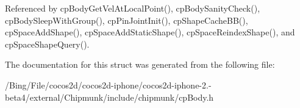 Referenced by cp\-Body\-Get\-Vel\-At\-Local\-Point(), cp\-Body\-Sanity\-Check(), cp\-Body\-Sleep\-With\-Group(), cp\-Pin\-Joint\-Init(), cp\-Shape\-Cache\-B\-B(), cp\-Space\-Add\-Shape(), cp\-Space\-Add\-Static\-Shape(), cp\-Space\-Reindex\-Shape(), and cp\-Space\-Shape\-Query().



The documentation for this struct was generated from the following file\-:\begin{DoxyCompactItemize}
\item 
/\-Bing/\-File/cocos2d/cocos2d-\/iphone/cocos2d-\/iphone-\/2.-\/beta4/external/\-Chipmunk/include/chipmunk/cp\-Body.\-h\end{DoxyCompactItemize}
